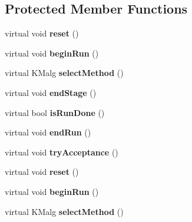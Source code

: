 \subsection*{Protected Member Functions}
\begin{DoxyCompactItemize}
\item 
\hypertarget{class_k_mlocal_swap_a0d7eb283ffc4dff2b1ed3c1e621e2b80}{
virtual void {\bfseries reset} ()}
\label{class_k_mlocal_swap_a0d7eb283ffc4dff2b1ed3c1e621e2b80}

\item 
\hypertarget{class_k_mlocal_swap_adaf01733adc31334ed500b90b144ebe6}{
virtual void {\bfseries beginRun} ()}
\label{class_k_mlocal_swap_adaf01733adc31334ed500b90b144ebe6}

\item 
\hypertarget{class_k_mlocal_swap_a4ae43cfaaa1e10fe77f73965334ca0da}{
virtual KMalg {\bfseries selectMethod} ()}
\label{class_k_mlocal_swap_a4ae43cfaaa1e10fe77f73965334ca0da}

\item 
\hypertarget{class_k_mlocal_swap_a70a8d8d298e57c324d2e45a62c8f424c}{
virtual void {\bfseries endStage} ()}
\label{class_k_mlocal_swap_a70a8d8d298e57c324d2e45a62c8f424c}

\item 
\hypertarget{class_k_mlocal_swap_ab57913c5e708502800a71d6f78920cd3}{
virtual bool {\bfseries isRunDone} ()}
\label{class_k_mlocal_swap_ab57913c5e708502800a71d6f78920cd3}

\item 
\hypertarget{class_k_mlocal_swap_a988c84df66bc099c378a002205b9e007}{
virtual void {\bfseries endRun} ()}
\label{class_k_mlocal_swap_a988c84df66bc099c378a002205b9e007}

\item 
\hypertarget{class_k_mlocal_swap_af3b761e9e91d984a3506fbe38cf1646a}{
virtual void {\bfseries tryAcceptance} ()}
\label{class_k_mlocal_swap_af3b761e9e91d984a3506fbe38cf1646a}

\item 
\hypertarget{class_k_mlocal_swap_a0d7eb283ffc4dff2b1ed3c1e621e2b80}{
virtual void {\bfseries reset} ()}
\label{class_k_mlocal_swap_a0d7eb283ffc4dff2b1ed3c1e621e2b80}

\item 
\hypertarget{class_k_mlocal_swap_adaf01733adc31334ed500b90b144ebe6}{
virtual void {\bfseries beginRun} ()}
\label{class_k_mlocal_swap_adaf01733adc31334ed500b90b144ebe6}

\item 
\hypertarget{class_k_mlocal_swap_a4ae43cfaaa1e10fe77f73965334ca0da}{
virtual KMalg {\bfseries selectMethod} ()}
\label{class_k_mlocal_swap_a4ae43cfaaa1e10fe77f73965334ca0da}


\end{DoxyCompactItemize}
